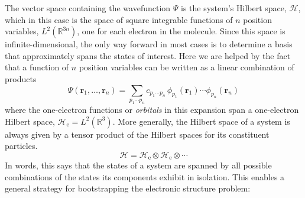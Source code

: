 The vector space containing the wavefunction \(\Psi\) is the system's Hilbert
space, \(\mathcal{H}\), which in this case is the space of square integrable
functions of \(n\) position variables,
\(
    L^2(\mathbb{R}^{3n})
\),
one for each electron in the molecule.
Since this space is infinite-dimensional, the only way forward in most cases is
to determine a basis that approximately spans the states of interest.
Here we are helped by the fact that a function of \(n\) position variables can
be written as a linear combination of products
\begin{equation}
    \Psi(\mathbf{r}_1, \dots, \mathbf{r}_n)
    =
    \sum_{p_1\cdots p_n}
    c_{p_1\cdots p_n}\,
    \phi_{p_1}(\mathbf{r}_1)
    \cdots
    \phi_{p_n}(\mathbf{r}_n)
\end{equation}
where the one-electron functions or {\itshape orbitals} in this expansion span a
one-electron Hilbert space,
\(
    \mathcal{H}_\mathrm{e}
    =
    L^2(\mathbb{R}^3)
\).
More generally, the Hilbert space of a system is always given by a tensor
product of the Hilbert spaces for its constituent particles.
\begin{equation}
    \mathcal{H}
    =
    \mathcal{H}_\mathrm{e}
    \otimes
    \mathcal{H}_\mathrm{e}
    \otimes
    \cdots
\end{equation}
In words, this says that the states of a system are spanned by all possible
combinations of the states its components exhibit in isolation.
This enables a general strategy for bootstrapping the electronic structure
problem:

